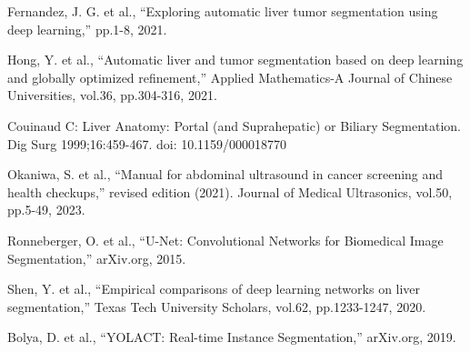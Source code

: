 \documentclass[12pt, a4paper]{article}
\begin{document}
\begin{thebibliography}{99} 

	Fernandez, J. G. et al., “Exploring automatic liver tumor segmentation using deep learning,” pp.1-8, 2021.
    
    Hong, Y. et al., “Automatic liver and tumor segmentation based on deep learning and globally optimized refinement,” Applied Mathematics-A Journal of Chinese Universities, vol.36, pp.304-316, 2021.

	Couinaud C: Liver Anatomy: Portal (and Suprahepatic) or Biliary Segmentation. Dig Surg 1999;16:459-467. doi: 10.1159/000018770

	Okaniwa, S. et al., “Manual for abdominal ultrasound in cancer screening and health checkups,” revised edition (2021). Journal of Medical Ultrasonics, vol.50, pp.5-49, 2023.

	Ronneberger, O. et al., “U-Net: Convolutional Networks for Biomedical Image Segmentation,” arXiv.org, 2015.

	Shen, Y. et al., “Empirical comparisons of deep learning networks on liver segmentation,” Texas Tech University Scholars, vol.62, pp.1233-1247, 2020.

	Bolya, D. et al., “YOLACT: Real-time Instance Segmentation,” arXiv.org, 2019.


    
    
    
    
    
    

\end{thebibliography}
\end{document}
